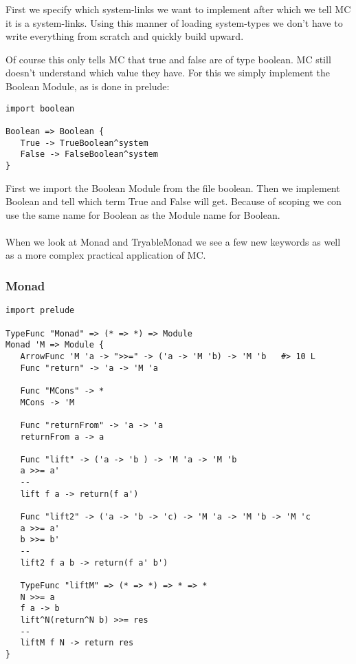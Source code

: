 First we specify which system-links we want to implement after which we tell MC it is a system-links.
Using this manner of loading system-types we don't have to write everything from scratch and quickly build upward.

Of course this only tells MC that true and false are of type boolean.
MC still doesn't understand which value they have.
For this we simply implement the Boolean Module, as is done in prelude:

\begin{lstlisting}
import boolean

Boolean => Boolean {
   True -> TrueBoolean^system
   False -> FalseBoolean^system
}
\end{lstlisting}

First we import the Boolean Module from the file boolean.
Then we implement Boolean and tell which term True and False will get.
Because of scoping we con use the same name for Boolean as the Module name for Boolean.

\paragraph{}
When we look at Monad and TryableMonad we see a few new keywords as well as a more complex practical application of MC.

\subsubsection{Monad}

\begin{lstlisting}
import prelude

TypeFunc "Monad" => (* => *) => Module
Monad 'M => Module {
   ArrowFunc 'M 'a -> ">>=" -> ('a -> 'M 'b) -> 'M 'b   #> 10 L
   Func "return" -> 'a -> 'M 'a

   Func "MCons" -> *
   MCons -> 'M

   Func "returnFrom" -> 'a -> 'a
   returnFrom a -> a

   Func "lift" -> ('a -> 'b ) -> 'M 'a -> 'M 'b
   a >>= a'
   --
   lift f a -> return(f a')

   Func "lift2" -> ('a -> 'b -> 'c) -> 'M 'a -> 'M 'b -> 'M 'c
   a >>= a'
   b >>= b'
   --
   lift2 f a b -> return(f a' b')

   TypeFunc "liftM" => (* => *) => * => *
   N >>= a
   f a -> b
   lift^N(return^N b) >>= res
   --
   liftM f N -> return res
}
\end{lstlisting}

